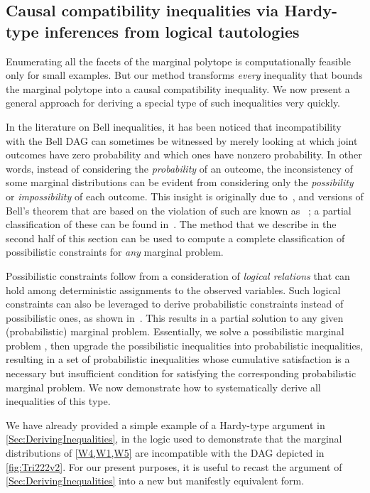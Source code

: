 \documentclass[aps,english,superscriptaddress,onecolumn,twoside,longbibliography,pra,floatfix,fleqn,nofootinbib]{revtex4-1}%
\newcommand*{\tblue}[1]{{\color{MidnightBlue}{\textbf{#1}}}}
\theoremstyle{definition}
\begin{document}
\subsection{Causal compatibility inequalities via Hardy-type inferences from logical tautologies}\label{sec:TSEM}


Enumerating all the facets of the marginal polytope is computationally feasible only for small examples. But our method transforms \emph{every} inequality that bounds the marginal polytope into a causal compatibility inequality. We now present a general approach for deriving a special type of such inequalities very quickly.

In the literature on Bell inequalities, it has been noticed that incompatibility with the Bell DAG can sometimes be witnessed by merely looking at which joint outcomes have zero probability and which ones have nonzero probability. In other words, instead of considering the \emph{probability} of an outcome, the inconsistency of some marginal distributions can be evident from considering only the \emph{possibility} or \emph{impossibility} of each outcome. This insight is originally due to~\citet{L.Hardy:PRL:1665}, and versions of Bell's theorem that are based on the violation of such \tblue{possibilistic constraints} are known as \tblue{Hardy-type paradoxes}~\cite{Garuccio95,CabelloHardyInequality,Braun08,Mancinska14,LSW}; a partial classification of these can be found in~\cite{Mansfield2012}. The method that we describe in the second half of this section can be used to compute a complete classification of possibilistic constraints for \emph{any} marginal problem.

Possibilistic constraints follow from a consideration of {\em logical relations} that can hold among deterministic assignments to the observed variables. Such logical constraints can also be leveraged to derive probabilistic constraints instead of possibilistic ones, as shown in~\cite{Pitowsky1989,Ghirardi08}. This results in a partial solution to any given (probabilistic) marginal problem. Essentially, we solve a possibilistic marginal problem \cite{Mansfield2012}, then upgrade the possibilistic inequalities into probabilistic inequalities, resulting in a set of probabilistic inequalities whose cumulative satisfaction is a necessary but insufficient condition for satisfying the corresponding probabilistic marginal problem. We now demonstrate how to systematically derive all inequalities of this type.

We have already provided a simple example of a Hardy-type argument in \cref{Sec:DerivingInequalities}, in the logic used to demonstrate that the marginal distributions of \cref{W4,W1,W5} are incompatible with the DAG depicted in \cref{fig:Tri222v2}.   For our present purposes, it is useful to recast the argument of \cref{Sec:DerivingInequalities} into a new but manifestly equivalent form.    
\end{document}
